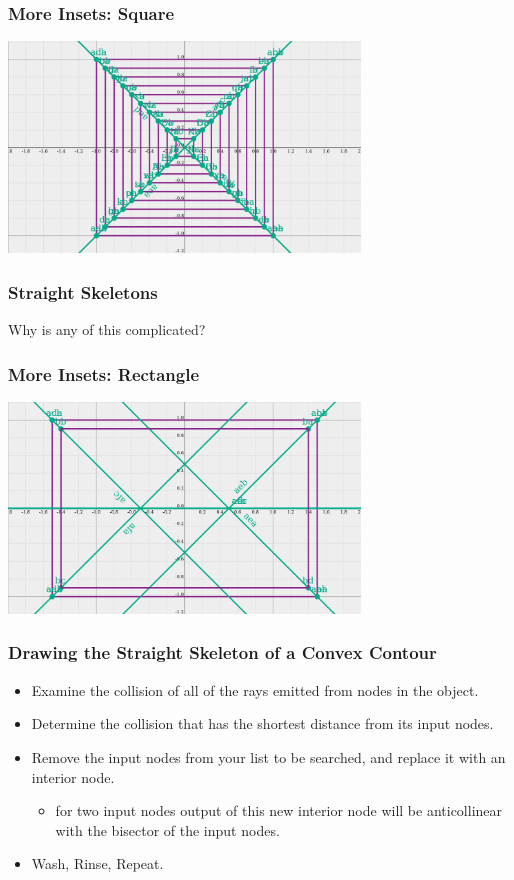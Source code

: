\documentclass[hyperref={pdfpagemode=FullScreen},aspectratio=169]{beamer}
\begin{document}
\begin{frame}
  \frametitle{More Insets: Square}
    \includegraphics[width=0.7\textwidth, center]{square-Straight_Skeleton_and_Insets.png}
\end{frame}

\begin{frame}
  \frametitle{Straight Skeletons}
  \Huge{\centerline{Why is any of this complicated?}}
\end{frame}

\begin{frame}
  \frametitle{More Insets: Rectangle}
  \includegraphics[width=0.7\textwidth, center]{rectangle-Straight_Skeleton_and_Inset.png}
\end{frame}

\begin{frame}
  \frametitle{Drawing the Straight Skeleton of a Convex Contour}
  \begin{itemize}
  \item Examine the collision of all of the rays emitted from nodes in the object.
  \item Determine the collision that has the shortest distance from its input nodes.
  \item Remove the input nodes from your list to be searched, and replace it with an interior node.
    \begin{itemize}
    \item for two input nodes output of this new interior node will be anticollinear with the bisector of the input nodes.
    \end{itemize}
  \item Wash, Rinse, Repeat.
  \end{itemize}
\end{frame}
\end{document}

